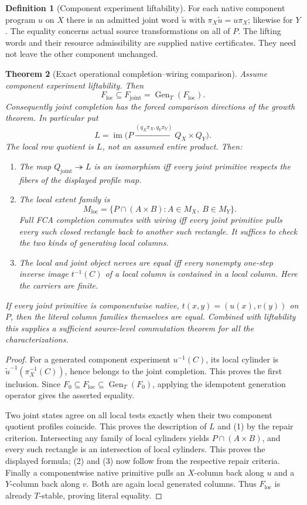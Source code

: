 \documentclass[11pt]{article}
\newtheorem{theorem}{Theorem}[section]
\theoremstyle{definition}\newtheorem{definition}[theorem]{Definition}
\theoremstyle{remark}\newtheorem{remark}[theorem]{Remark}
\newcommand{\Gen}{\operatorname{Gen}}
\newcommand{\im}{\operatorname{im}}
\begin{document}
\begin{definition}[Component experiment liftability]
For each native component program $u$ on $X$ there is an admitted
joint word $\widetilde u$ with
$\pi_X\widetilde u=u\pi_X$; likewise for $Y$.
The equality concerns actual source transformations on all of $P$.
The lifting words and their resource admissibility are supplied native
certificates. They need not leave the other component unchanged.
\end{definition}
\begin{theorem}[Exact operational completion--wiring comparison]
Assume component experiment liftability. Then
\[
 F_{\mathrm{loc}}\subseteq F_{\mathrm{joint}}
 =\Gen_T(F_{\mathrm{loc}}).
\]
Consequently joint completion has the forced comparison directions
of the growth theorem. In particular put
\[
 L=\im\bigl(P\xrightarrow{(q_X\pi_X,q_Y\pi_Y)}Q_X\times Q_Y\bigr).
\]
The local row quotient is $L$, not an assumed entire product. Then:
\begin{enumerate}
\item The map $Q_{\mathrm{joint}}\twoheadrightarrow L$ is an
isomorphism iff every joint primitive respects the fibers of the
displayed profile map.
\item The local extent family is
\[
 M_{\mathrm{loc}}=
 \{P\cap(A\times B):A\in M_X,\ B\in M_Y\}.
\]
Full FCA completion commutes with wiring iff every joint primitive
pulls every such closed rectangle back to another such rectangle.
It suffices to check the two kinds of generating local columns.
\item The local and joint object nerves are equal iff every nonempty
one-step inverse image $t^{-1}(C)$ of a local column is contained in
a local column. Here the carriers are finite.
\end{enumerate}
If every joint primitive is componentwise native,
$t(x,y)=(u(x),v(y))$ on $P$, then the literal column families themselves
are equal. Combined with liftability this supplies a sufficient
source-level commutation theorem for all the characterizations.
\end{theorem}
\begin{proof}
For a generated component experiment $u^{-1}(C)$, its local cylinder
is $\widetilde u^{-1}(\pi_X^{-1}(C))$, hence belongs to the joint
completion. This proves the first inclusion. Since
$F_0\subseteq F_{\mathrm{loc}}\subseteq\Gen_T(F_0)$, applying the
idempotent generation operator gives the asserted equality.

Two joint states agree on all local tests exactly when their two
component quotient profiles coincide. This proves the description of
$L$ and (1) by the repair criterion. Intersecting any family of local
cylinders yields $P\cap(A\times B)$, and every such rectangle is an
intersection of local cylinders. This proves the displayed formula;
(2) and (3) now follow from the respective repair criteria. Finally a
componentwise native primitive pulls an $X$-column back along $u$ and
a $Y$-column back along $v$. Both are again local generated columns.
Thus $F_{\mathrm{loc}}$ is already $T$-stable, proving literal equality.
\end{proof}
\end{document}
